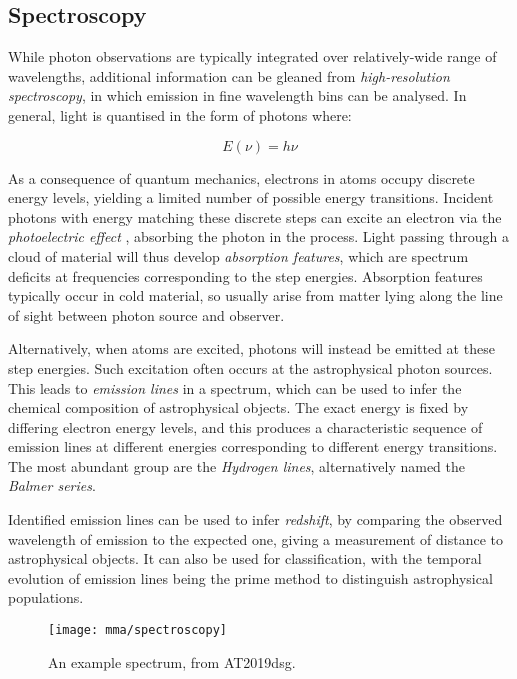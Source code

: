  \subsection*{Spectroscopy}

While photon observations are typically integrated over relatively-wide range of wavelengths, additional information can be gleaned from \emph{high-resolution spectroscopy}, in which emission in fine wavelength bins can be analysed. In general, light is quantised in the form of photons where:

\begin{equation}
	E(\nu) = h \nu
	\label{eq:planck}
\end{equation}

As a consequence of quantum mechanics, electrons in atoms occupy discrete energy levels, yielding a limited number of possible energy transitions. Incident photons with energy matching these discrete steps can excite an electron via  the \emph{photoelectric effect} , absorbing the photon in the process. Light passing through a cloud of material will thus develop \emph{absorption features}, which are spectrum deficits at frequencies corresponding to the step energies. Absorption features typically occur in cold material, so usually arise from matter lying along the line of sight between photon source and observer.

Alternatively, when atoms are excited, photons will instead be emitted at these step energies. Such excitation often occurs at the astrophysical photon sources. This leads to \emph{emission lines} in a spectrum, which can be used to infer the chemical composition of astrophysical objects. The exact energy is fixed by differing electron energy levels, and this produces a characteristic sequence of emission lines at different energies corresponding to different energy transitions. The most abundant group are the \emph{Hydrogen lines}, alternatively named the \emph{Balmer series}.

Identified emission lines can be used to infer \emph{redshift}, by comparing the observed wavelength of emission to the expected one, giving a measurement of distance to astrophysical objects. It can also be used for classification, with the temporal evolution of emission lines being the prime method to distinguish astrophysical populations. 

\begin{figure}[!ht]
	\centering \texttt{[image: mma/spectroscopy]}
	\caption{An example spectrum, from AT2019dsg.}
	\label{fig:spectrum}
\end{figure}


